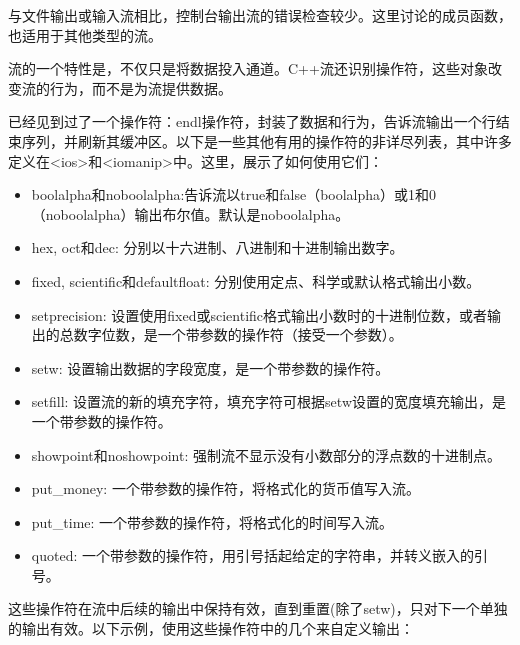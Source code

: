 与文件输出或输入流相比，控制台输出流的错误检查较少。这里讨论的成员函数，也适用于其他类型的流。


流的一个特性是，不仅只是将数据投入通道。C++流还识别操作符，这些对象改变流的行为，而不是为流提供数据。

已经见到过了一个操作符：endl操作符，封装了数据和行为，告诉流输出一个行结束序列，并刷新其缓冲区。以下是一些其他有用的操作符的非详尽列表，其中许多定义在<ios>和<iomanip>中。这里，展示了如何使用它们：

\begin{itemize}
\item
boolalpha和noboolalpha:告诉流以true和false（boolalpha）或1和0（noboolalpha）输出布尔值。默认是noboolalpha。

\item
hex, oct和dec: 分别以十六进制、八进制和十进制输出数字。

\item
fixed, scientific和defaultfloat: 分别使用定点、科学或默认格式输出小数。

\item
setprecision: 设置使用fixed或scientific格式输出小数时的十进制位数，或者输出的总数字位数，是一个带参数的操作符（接受一个参数）。

\item
setw: 设置输出数据的字段宽度，是一个带参数的操作符。

\item
setfill: 设置流的新的填充字符，填充字符可根据setw设置的宽度填充输出，是一个带参数的操作符。

\item
showpoint和noshowpoint: 强制流不显示没有小数部分的浮点数的十进制点。

\item
put\_money: 一个带参数的操作符，将格式化的货币值写入流。

\item
put\_time: 一个带参数的操作符，将格式化的时间写入流。

\item
quoted: 一个带参数的操作符，用引号括起给定的字符串，并转义嵌入的引号。
\end{itemize}

这些操作符在流中后续的输出中保持有效，直到重置(除了setw)，只对下一个单独的输出有效。以下示例，使用这些操作符中的几个来自定义输出：

